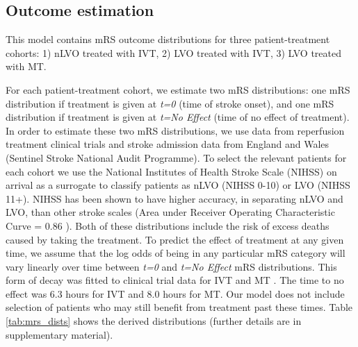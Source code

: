 \subsection{Outcome estimation}

This model contains mRS outcome distributions for three patient-treatment cohorts: 1) nLVO treated with IVT, 2) LVO treated with IVT, 3) LVO treated with MT.

For each patient-treatment cohort, we estimate two mRS distributions: one mRS distribution if treatment is given at \emph{t=0} (time of stroke onset), and one mRS distribution if treatment is given at \emph{t=No Effect} (time of no effect of treatment). In order to estimate these two mRS distributions, we use data from reperfusion treatment clinical trials \cite{lees_time_2010, emberson_effect_2014, goyal_endovascular_2016, fransen_time_2016} and stroke admission data from England and Wales (Sentinel Stroke National Audit Programme). To select the relevant patients for each cohort we use the National Institutes of Health Stroke Scale (NIHSS) on arrival as a surrogate to classify patients as nLVO (NIHSS 0-10) or LVO (NIHSS 11+). NIHSS has been shown to have higher accuracy, in separating nLVO and LVO, than other stroke scales (Area under Receiver Operating Characteristic Curve = 0.86 \cite{duvekot_comparison_2021}). Both of these distributions include the risk of excess deaths caused by taking the treatment. To predict the effect of treatment at any given time, we assume that the log odds of being in any particular mRS category will vary linearly over time between \textit{t=0} and \textit{t=No Effect} mRS distributions. This form of decay was fitted to clinical trial data for IVT \cite{emberson_effect_2014} and MT \cite{fransen_time_2016}. The time to no effect was 6.3 hours for IVT and 8.0 hours for MT. Our model does not include selection of patients who may still benefit from treatment past these times. Table \ref{tab:mrs_dists} shows the derived distributions (further details are in supplementary material).

